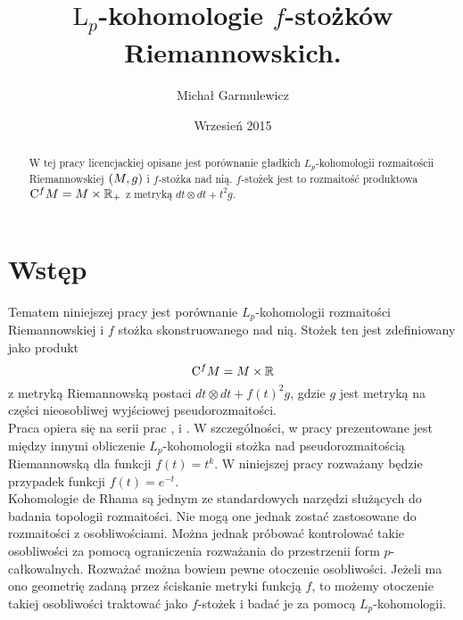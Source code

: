 \documentclass[licencjacka]{pracamgr}
\author{Michał Garmulewicz}
\title{$\mathrm{L}_p$-kohomologie $f$-stożków Riemannowskich.}
\date{Wrzesień 2015}
\theoremstyle{definition}
\theoremstyle{definition}
\theoremstyle{plain}
\theoremstyle{plain}
\theoremstyle{plain}
\theoremstyle{plain}
\def\cfm{\ensuremath\mathrm{C}^fM}
\def\M{\ensuremath M}
\def\R{\ensuremath\mathbb{R}}
\begin{document}
\maketitle

\begin{abstract}
  W tej pracy licencjackiej opisane jest porównanie gładkich $L_p$-kohomologii
  rozmaitościi Riemannowskiej $(\M, g)$ i $f$-stożka nad nią. $f$-stożek jest
  to rozmaitość produktowa $\cfm = \M \times \R_+$ z metryką 
  $dt \otimes dt + t^2 g$. 
\end{abstract}

\tableofcontents


\chapter{Wstęp}

Tematem niniejszej pracy jest porównanie $L_p$-kohomologii
rozmaitości Riemannowskiej i $f$ stożka skonstruowanego nad nią.
Stożek ten jest zdefiniowany jako produkt 
\[
\cfm = \M \times \R
\]
z metryką Riemannowską
postaci
$dt \otimes dt + f(t)^2 g$, gdzie $g$ 
jest metryką na części nieosobliwej wyjściowej pseudorozmaitości. \\

Praca opiera się na serii prac \cite{cheeger}, \cite{youssin} i \cite{weber}.
W szczególności, w pracy \cite{weber} prezentowane jest między innymi
obliczenie $L_p$-kohomologii stożka nad pseudorozmaitością Riemannowską dla
funkcji $f(t) = t^k$. W niniejszej pracy rozważany będzie przypadek funkcji
$f(t) = e^{-t}$. \\

Kohomologie de Rhama są jednym ze standardowych narzędzi służących do badania
topologii rozmaitości.  Nie mogą one jednak zostać zastosowane do rozmaitości z
osobliwościami.  Można jednak próbować kontrolować takie osobliwości za pomocą
ograniczenia rozważania do przestrzenii form $p$-całkowalnych.  Rozważać można
bowiem pewne otoczenie osobliwości. Jeżeli ma ono geometrię zadaną przez
ściskanie metryki funkcją $f$, to możemy otoczenie takiej osobliwości traktować
jako $f$-stożek i badać je za pomocą $L_p$-kohomologii.\\
\end{document}

